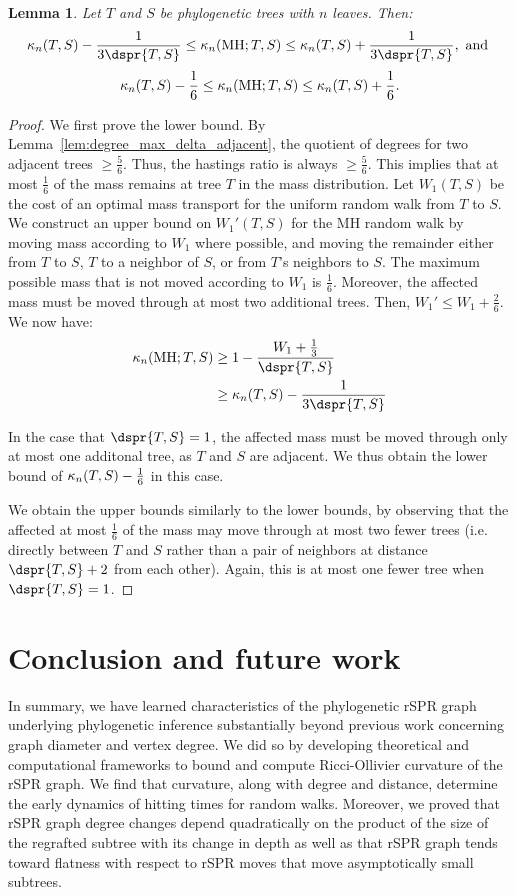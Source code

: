 \documentclass[11pt,onecolumn,conference]{IEEEtran}
\newtheorem{lemma}[theorem]{Lemma}
\newcommand{\MH}{\operatorname{MH}}
\newcommand{\curvature}[2][]{%
    \ifthenelse{\equal{#1}{}}%
		{\kappa_n(#2)}%
		{\kappa_n(#1;#2)}%
}
\begin{document}
\begin{lemma}
	Let $T$ and $S$ be phylogenetic trees with $n$ leaves. Then:
	$$\curvature{T,S} - \frac{1}{3\dspr{T,S}}
	\le \curvature[\MH]{T,S}
	\le \curvature{T,S} + \frac{1}{3\dspr{T,S}}, \text{ and }$$
	$$\curvature{T,S} - \frac{1}{6}
	\le \curvature[\MH]{T,S}
	\le \curvature{T,S} + \frac{1}{6}.$$
\end{lemma}
\begin{proof}
	We first prove the lower bound.
	By Lemma~\ref{lem:degree_max_delta_adjacent}, the quotient of degrees for two adjacent trees $\ge \frac{5}{6}$.
	Thus, the hastings ratio is always $\ge \frac{5}{6}$.
	This implies that at most $\frac{1}{6}$ of the mass remains at tree $T$ in the mass distribution.
	Let $W_1(T,S)$ be the cost of an optimal mass transport for the uniform random walk from $T$ to $S$.
	We construct an upper bound on $W_1'(T,S)$ for the MH random walk by moving mass according to $W_1$ where possible, and moving the remainder either from $T$ to $S$, $T$ to a neighbor of $S$, or from $T$'s neighbors to $S$.
	The maximum possible mass that is not moved according to $W_1$ is $\frac{1}{6}$.
	Moreover, the affected mass must be moved through at most two additional trees.
	Then, $W_1' \le W_1 + \frac{2}{6}$.
	We now have:
	\begin{align*}
		\curvature[\MH]{T,S} & \ge 1 - \frac{W_1 + \frac{1}{3}}{\dspr{T,S}} \\
		& \ge \curvature{T,S} - \frac{1}{3\dspr{T,S}}
	\end{align*}

	In the case that $\dspr{T,S}=1$, the affected mass must be moved through only at most one additonal tree, as $T$ and $S$ are adjacent.
	We thus obtain the lower bound of $\curvature{T,S} - \frac{1}{6}$ in this case.

	We obtain the upper bounds similarly to the lower bounds, by observing that the affected at most $\frac{1}{6}$ of the mass may move through at most two fewer trees (i.e. directly between $T$ and $S$ rather than a pair of neighbors at distance $\dspr{T,S} + 2$ from each other).
	Again, this is at most one fewer tree when $\dspr{T,S}=1$.
\end{proof}

\section{Conclusion and future work}
In summary, we have learned characteristics of the phylogenetic rSPR graph underlying phylogenetic inference substantially beyond previous work concerning graph diameter and vertex degree.
We did so by developing theoretical and computational frameworks to bound and compute Ricci-Ollivier curvature of the rSPR graph.
We find that curvature, along with degree and distance, determine the early dynamics of hitting times for random walks.
Moreover, we proved that rSPR graph degree changes depend quadratically on the product of the size of the regrafted subtree with its change in depth as well as that rSPR graph tends toward flatness with respect to rSPR moves that move asymptotically small subtrees.
\end{document}
